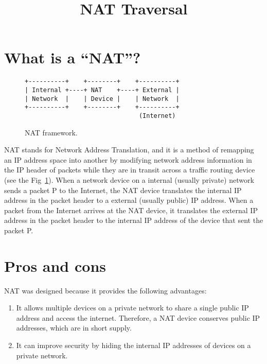 
\title{NAT Traversal}

\maketitle

\section{What is a ``NAT''?}

\begin{figure}
\begin{verbatim}
+----------+    +--------+    +----------+
| Internal +----+ NAT    +----+ External |
| Network  |    | Device |    | Network  |
+----------+    +--------+    +----------+
                               (Internet)
\end{verbatim}
\caption{NAT framework.}
\label{fig:NAT_framework}
\end{figure}

NAT stands for Network Address Translation, and it is a method of
remapping an IP address space into another by modifying network
address information in the IP header of packets while they are in
transit across a traffic routing device (see the
Fig~\ref{fig:NAT_framework}). When a network device on a internal
(usually private) network sends a packet P to the Internet, the NAT
device translates the internal IP address in the packet header to a
external (usually public) IP address. When a packet from the Internet
arrives at the NAT device, it translates the external IP address in
the packet header to the internal IP address of the device that sent
the packet P.

\section{Pros and cons}

NAT was designed because it provides the following advantages:
\begin{enumerate}
\item It allows multiple devices on a private network to share a
  single public IP address and access the internet. Therefore, a NAT
  device conserves public IP addresses, which are in short supply.
\item It can improve security by hiding the internal IP addresses of
  devices on a private network.
\end{enumerate}

